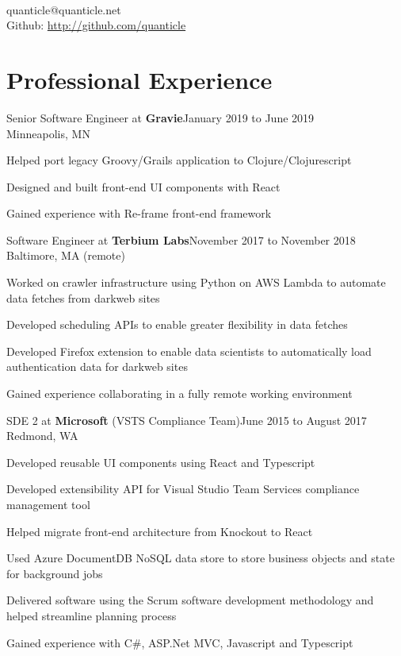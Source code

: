 \documentclass[letterpaper]{article}
\newenvironment{resume-list}
{\begin{itemize}
 \setlength{\itemsep}{0pt}
 \setlength{\parskip}{0pt}}
{\end{itemize}}
\begin{document}
\\
{\small quanticle@quanticle.net}\\
{\small Github: \url{http://github.com/quanticle}}\\
\section*{Professional Experience}
\noindent Senior Software Engineer at {\bfseries Gravie}\dotfill January 2019 to June 2019\\
Minneapolis, MN
\begin{resume-list}
\item Helped port legacy Groovy/Grails application to Clojure/Clojurescript
\item Designed and built front-end UI components with React
\item Gained experience with Re-frame front-end framework
\end{resume-list}
\noindent Software Engineer at {\bfseries Terbium Labs}\dotfill November 2017 to November 2018\\
Baltimore, MA (remote)
\begin{resume-list}
\item Worked on crawler infrastructure using Python on AWS Lambda to automate data fetches from darkweb sites
\item Developed scheduling APIs to enable greater flexibility in data fetches
\item Developed Firefox extension to enable data scientists to automatically load authentication data for darkweb sites
\item Gained experience collaborating in a fully remote working environment
\end{resume-list}
\noindent SDE 2 at {\bfseries Microsoft} (VSTS Compliance Team)\dotfill June 2015 to August 2017\\
Redmond, WA
\begin{resume-list}
\item Developed reusable UI components using React and Typescript
\item Developed extensibility API for Visual Studio Team Services compliance management tool
\item Helped migrate front-end architecture from Knockout to React
\item Used Azure DocumentDB NoSQL data store to store business objects and state for background jobs
\item Delivered software using the Scrum software development methodology and helped streamline planning process
\item Gained experience with C\#, ASP.Net MVC, Javascript and Typescript
\end{resume-list}
\end{document}
